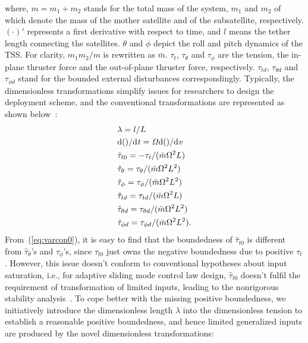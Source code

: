 \documentclass[3p]{elsarticle}
\theoremstyle{plain}
\theoremstyle{remark}
\begin{document}
where, $m = m_1+m_2$ stands for the total mass of the system, $m_1$ and $m_2$ of which denote the mass of the mother satellite and of the subsatellite, respectively. $(\cdot)'$ represents a first derivative with respect to time, and $l$ means the tether length connecting the satellites. $\theta$ and $\phi$ depict the roll and pitch dynamics of the TSS. For clarity, $m_1m_2/m$ is rewritten as $\bar m$. $\tau_t$, $\tau_\theta$ and $\tau_\phi$ are the tension, the in-plane thruster force and the out-of-plane thruster force, respectively. $\tau_{t d}$, $\tau_{\theta d}$ and $\tau_{\phi d}$ stand for the bounded external disturbances correspondingly. Typically, the dimensionless transformations simplify issues for researchers to design the deployment scheme, and the conventional transformations are represented as shown below~\cite{williams2009yes2,wen2015space,wen2016constrained}:
\begin{align}
\begin{split}
&\lambda=l/L\\
&\rm{d}\it{()}/\rm{d}\it{t}=\Omega \rm{d}\it{()}/\rm{d}\it{v}\\
&\hat{\tau}_{t0}=-\tau_t/(\bar{m}\Omega^2L)\\
&\hat{\tau}_\theta=\tau_\theta/(\bar{m}\Omega^2L^2)\\
&\hat{\tau}_\phi = \tau_\phi/(\bar{m}\Omega^2L^2)\\
&\hat{\tau}_{td}=\tau_{td}/(\bar{m}\Omega^2L)\\
&\hat{\tau}_{\theta d}=\tau_{\theta d}/(\bar{m}\Omega^2L^2)\\
&\hat{\tau}_{\phi d}= \tau_{\phi d}/(\bar{m}\Omega^2L^2)\label{eq:varcon0}.
\end{split}
\end{align}
From~(\ref{eq:varcon0}), it is easy to find that the boundedness of $\hat{\tau}_{t0}$ is different from $\hat{\tau}_\theta$'s and $\hat{\tau}_\phi$'s, since $\hat{\tau}_{t0}$ just owns the negative boundedness due to positive $\tau_t$. However, this issue doesn't conform to conventional hypotheses about input saturation, i.e., for adaptive sliding mode control law design, $\hat{\tau}_{t0}$ doesn't fulfil the requirement of transformation of limited inputs, leading to the nonrigorous stability analysis~\cite{Hu2008552,6060930}. To cope better with the missing positive boundedness, we initiatively introduce the dimensionless length $\lambda$ into the dimensionless tension to establish a reasonable positive boundedness, and hence limited generalized inputs are produced by the novel dimensionless transformations:
\end{document}
